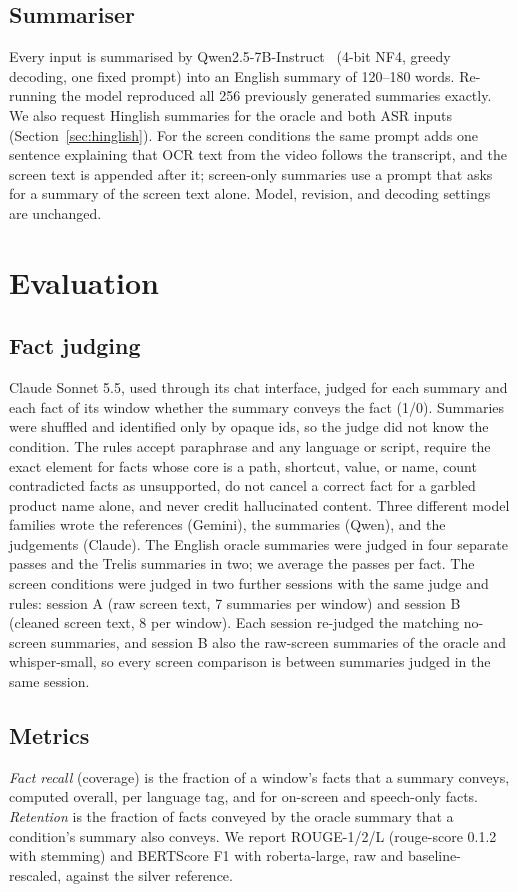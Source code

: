 \documentclass[conference]{IEEEtran}
\begin{document}
\subsection{Summariser}
Every input is summarised by Qwen2.5-7B-Instruct~\cite{qwen2025} (4-bit NF4, greedy decoding, one fixed prompt) into an English summary of 120--180 words. Re-running the model reproduced all 256 previously generated summaries exactly. We also request Hinglish summaries for the oracle and both ASR inputs (Section~\ref{sec:hinglish}). For the screen conditions the same prompt adds one sentence explaining that OCR text from the video follows the transcript, and the screen text is appended after it; screen-only summaries use a prompt that asks for a summary of the screen text alone. Model, revision, and decoding settings are unchanged.

\section{Evaluation}
\subsection{Fact judging}
Claude Sonnet 5.5, used through its chat interface, judged for each summary and each fact of its window whether the summary conveys the fact (1/0). Summaries were shuffled and identified only by opaque ids, so the judge did not know the condition. The rules accept paraphrase and any language or script, require the exact element for facts whose core is a path, shortcut, value, or name, count contradicted facts as unsupported, do not cancel a correct fact for a garbled product name alone, and never credit hallucinated content. Three different model families wrote the references (Gemini), the summaries (Qwen), and the judgements (Claude). The English oracle summaries were judged in four separate passes and the Trelis summaries in two; we average the passes per fact. The screen conditions were judged in two further sessions with the same judge and rules: session A (raw screen text, 7 summaries per window) and session B (cleaned screen text, 8 per window). Each session re-judged the matching no-screen summaries, and session B also the raw-screen summaries of the oracle and whisper-small, so every screen comparison is between summaries judged in the same session.

\subsection{Metrics}
\emph{Fact recall} (coverage) is the fraction of a window's facts that a summary conveys, computed overall, per language tag, and for on-screen and speech-only facts. \emph{Retention} is the fraction of facts conveyed by the oracle summary that a condition's summary also conveys. We report ROUGE-1/2/L (rouge-score 0.1.2 with stemming) and BERTScore F1 with roberta-large, raw and baseline-rescaled, against the silver reference.
\end{document}
